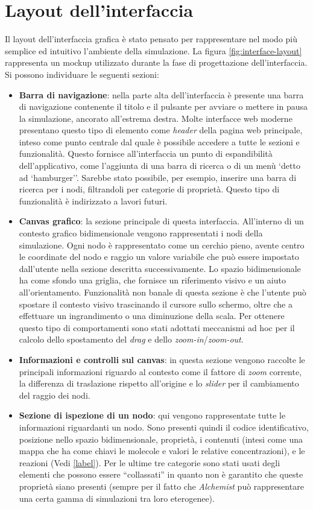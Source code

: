 \section{Layout dell'interfaccia}
Il layout dell'interfaccia grafica è stato pensato per rappresentare nel modo più semplice ed intuitivo l'ambiente della simulazione.  La figura \ref{fig:interface-layout} rappresenta un mockup utilizzato durante la fase di progettazione dell'interfaccia. Si possono individuare le seguenti sezioni:
\begin{itemize}
	\item \textbf{Barra di navigazione}: nella parte alta dell'interfaccia è presente una barra di navigazione contenente il titolo e il pulsante per avviare o mettere in pausa la simulazione, ancorato all'estrema destra. Molte interfacce web moderne presentano questo tipo di elemento come \textit{header} della pagina web principale, inteso come punto centrale dal quale è possibile accedere a tutte le sezioni e funzionalità. Questo fornisce all'interfaccia un punto di espandibilità dell'applicativo, come l'aggiunta di una barra di ricerca o di un menù `detto ad `hamburger''. Sarebbe stato possibile, per esempio, inserire una barra di ricerca per i nodi, filtrandoli per categorie di proprietà. Questo tipo di funzionalità è indirizzato a lavori futuri. 
	\item \textbf{Canvas grafico}: la sezione principale di questa interfaccia. All'interno di un contesto grafico bidimensionale vengono rappresentati i nodi della simulazione. Ogni nodo è rappresentato come un cerchio pieno, avente centro le coordinate del nodo e raggio un valore variabile che può essere impostato dall'utente nella sezione descritta successivamente. Lo spazio bidimensionale ha come sfondo una griglia, che  fornisce un riferimento visivo e un aiuto all'orientamento. Funzionalità non banale di questa sezione è che l'utente può spostare il contesto visivo trascinando il cursore sullo schermo, oltre che a effettuare un ingrandimento o una diminuzione della scala. Per ottenere questo tipo di comportamenti sono stati adottati meccanismi ad hoc per il calcolo dello spostamento del \textit{drag} e dello \textit{zoom-in}/\textit{zoom-out}.
	\item \textbf{Informazioni e controlli sul canvas}: in questa sezione vengono raccolte le principali informazioni riguardo al contesto come il fattore di \textit{zoom} corrente, la differenza di traslazione rispetto all'origine e lo \textit{slider} per il cambiamento del raggio dei nodi.
	\item \textbf{Sezione di ispezione di un nodo}: qui vengono rappresentate tutte le informazioni riguardanti un nodo. Sono presenti quindi il codice identificativo, posizione nello spazio bidimensionale, proprietà, i contenuti (intesi come una mappa che ha come chiavi le molecole e  valori le relative concentrazioni), e le reazioni (Vedi \ref{label}). Per le ultime tre categorie sono stati usati degli elementi che possono essere ``collassati'' in quanto non è garantito che queste proprietà siano presenti (sempre per il fatto che \textit{Alchemist} può rappresentare una certa gamma di simulazioni tra loro eterogenee).
\end{itemize}

